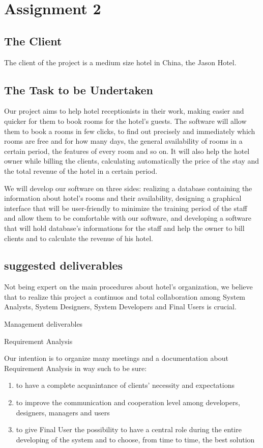 
\section{Assignment 2}

\subsection{The Client}
The client of the project is a medium size hotel in China, the Jason Hotel.

\subsection{The Task to be Undertaken}
Our project aims to help hotel receptionists in their work, making easier and quicker for them to book rooms for the hotel's guests. The software will allow them to book a rooms in few clicks, to find out precisely and immediately which rooms are free and for how many days, the general availability of rooms in a certain period, the features of every room and so on. It will also help the hotel owner while billing the clients, calculating automatically the price of the stay and the total revenue of the hotel in a certain period.

We will develop our software on three sides: realizing a database containing the information about hotel's rooms and their availability, designing a graphical interface that will be user-friendly to minimize the training period of the staff and allow them to be comfortable with our software, and developing a software that will hold database's informations for the staff and help the owner to bill clients and to calculate the revenue of his hotel.




\subsection{suggested deliverables}
Not being expert on the main procedures about hotel’s organization, we believe that to realize this project a continuos and total collaboration among System Analysts, System Designers, System Developers and Final Users is crucial.


Management deliverables

Requirement Analysis 
	
	Our intention is to organize many meetings and a documentation about Requirement Analysis in way such to be sure:
\begin{enumerate}
	\item to have a complete acquaintance of clients’ necessity and expectations
	\item to improve the communication and cooperation level among developers,
	  designers, managers and users
	\item to give Final User the possibility to have a central role during the entire 
	  developing of the system and to choose, from time to time, the best solution
\end{enumerate}

